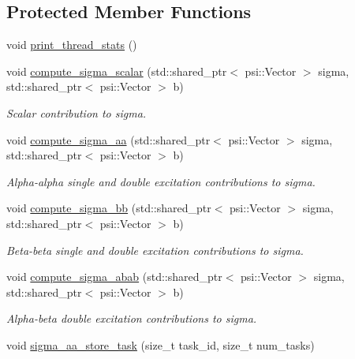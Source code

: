 \subsection*{Protected Member Functions}
\begin{DoxyCompactItemize}
\item 
void \mbox{\hyperlink{classforte_1_1_sigma_vector_dynamic_a9c168362117643a0a0422a1213143c05}{print\+\_\+thread\+\_\+stats}} ()
\item 
void \mbox{\hyperlink{classforte_1_1_sigma_vector_dynamic_a997eaf87b10fdd2ea9e65dc28a4f5707}{compute\+\_\+sigma\+\_\+scalar}} (std\+::shared\+\_\+ptr$<$ psi\+::\+Vector $>$ sigma, std\+::shared\+\_\+ptr$<$ psi\+::\+Vector $>$ b)
\begin{DoxyCompactList}\small\item\em Scalar contribution to sigma. \end{DoxyCompactList}\item 
void \mbox{\hyperlink{classforte_1_1_sigma_vector_dynamic_aa56beb4165e25347cd21925d58ab5850}{compute\+\_\+sigma\+\_\+aa}} (std\+::shared\+\_\+ptr$<$ psi\+::\+Vector $>$ sigma, std\+::shared\+\_\+ptr$<$ psi\+::\+Vector $>$ b)
\begin{DoxyCompactList}\small\item\em Alpha-\/alpha single and double excitation contributions to sigma. \end{DoxyCompactList}\item 
void \mbox{\hyperlink{classforte_1_1_sigma_vector_dynamic_a4cd2eff1fd65a16afd4a9be40abfed23}{compute\+\_\+sigma\+\_\+bb}} (std\+::shared\+\_\+ptr$<$ psi\+::\+Vector $>$ sigma, std\+::shared\+\_\+ptr$<$ psi\+::\+Vector $>$ b)
\begin{DoxyCompactList}\small\item\em Beta-\/beta single and double excitation contributions to sigma. \end{DoxyCompactList}\item 
void \mbox{\hyperlink{classforte_1_1_sigma_vector_dynamic_aff4d059b14d67c178e16fa981cf2f98b}{compute\+\_\+sigma\+\_\+abab}} (std\+::shared\+\_\+ptr$<$ psi\+::\+Vector $>$ sigma, std\+::shared\+\_\+ptr$<$ psi\+::\+Vector $>$ b)
\begin{DoxyCompactList}\small\item\em Alpha-\/beta double excitation contributions to sigma. \end{DoxyCompactList}\item 
void \mbox{\hyperlink{classforte_1_1_sigma_vector_dynamic_a1c05cdfb083520638f8f581d9288dc85}{sigma\+\_\+aa\+\_\+store\+\_\+task}} (size\+\_\+t task\+\_\+id, size\+\_\+t num\+\_\+tasks)

\end{DoxyCompactItemize}
